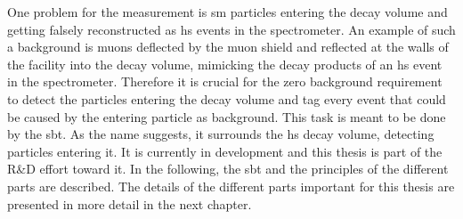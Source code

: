 One problem for the measurement is \ac{sm} particles entering the decay volume and getting falsely reconstructed as \ac{hs} events in the spectrometer.
An example of such a background is muons deflected by the muon shield and reflected at the walls of the facility into the decay volume, mimicking the decay products of an \ac{hs} event in the spectrometer.
Therefore it is crucial for the zero background requirement to detect the particles entering the decay volume and tag every event that could be caused by the entering particle as background.
This task is meant to be done by the \ac{sbt}.
As the name suggests, it surrounds the \ac{hs} decay volume, detecting particles entering it.
It is currently in development and this thesis is part of the R\&D effort toward it.
In the following, the \ac{sbt} and the principles of the different parts are described.
The details of the different parts important for this thesis are presented in more detail in the next chapter.

